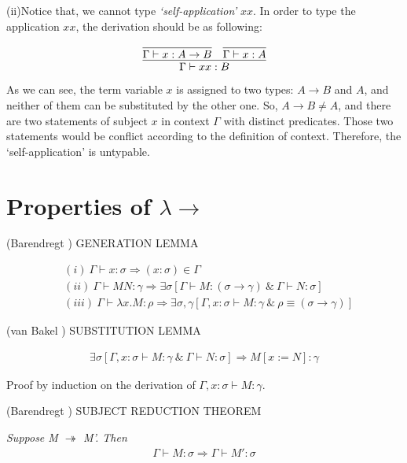 (ii)Notice that, we cannot type \textit{`self-application'} $xx$. In order to type the application $xx$, the derivation should be as following:

$$
\infer{\Gamma \vdash xx:B}{
    \infer{\Gamma \vdash x:A \rightarrow B}{} 
    &
    \infer{\Gamma \vdash x:A}{}
}
$$


As we can see, the term variable $x$ is assigned to two types: $A \rightarrow B$ and $A$, and neither of them can be substituted by the other one. So, $A \rightarrow B \neq A$, and there are two statements of subject $x$ in context $\Gamma$ with distinct predicates. Those two statements would be conflict according to the definition of context. Therefore, the `self-application' is untypable. 


\section{Properties of $\lambda \rightarrow $}

\begin{lemma}
\normalfont (Barendregt \cite{barendregt1984introduction}) GENERATION LEMMA
\end{lemma}
\begin{align*}
  &(i)\ \Gamma \vdash x:\sigma \Rightarrow (x:\sigma)\in \Gamma \\
  &(ii)\ \Gamma \vdash MN:\gamma \Rightarrow \exists \sigma[\Gamma \vdash M:(\sigma \rightarrow \gamma)\ \& \ \Gamma \vdash N:\sigma]\\
  &(iii)\ \Gamma \vdash \lambda x.M:\rho \Rightarrow \exists \sigma ,\gamma[\Gamma ,x:\sigma \vdash M:\gamma\ \& \ \rho \equiv (\sigma \rightarrow \gamma)] 
\end{align*}


\begin{lemma}
\normalfont (van Bakel \cite{svb2001type}) SUBSTITUTION LEMMA
\end{lemma}
\begin{align*}
   \exists \sigma[\Gamma,x:\sigma \vdash M:\gamma \ \& \ \Gamma \vdash N:\sigma]\Rightarrow M[x:=N]:\gamma
\end{align*}

Proof by induction on the derivation of $\Gamma,x:\sigma \vdash M:\gamma$.

\begin{theorem}
\normalfont (Barendregt \cite{barendregt1984introduction}) \textsc{SUBJECT REDUCTION THEOREM}
\end{theorem}

\textit{Suppose M $\twoheadrightarrow$ M'. Then} 
\begin{align*}
   \Gamma \vdash M:\sigma \Rightarrow \Gamma \vdash M':\sigma
\end{align*}

